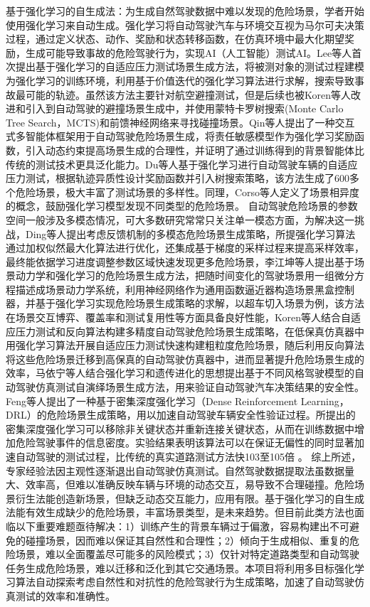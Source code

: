 基于强化学习的自生成法：为生成自然驾驶数据中难以发现的危险场景，学者开始使用强化学习来自动生成。强化学习将自动驾驶汽车与环境交互视为马尔可夫决策过程，通过定义状态、动作、奖励和状态转移函数，在仿真环境中最大化期望奖励，生成可能导致事故的危险驾驶行为，实现AI（人工智能）测试AI。Lee等人首次提出基于强化学习的自适应压力测试场景生成方法，将被测对象的测试过程建模为强化学习的训练环境，利用基于价值迭代的强化学习算法进行求解，搜索导致事故最可能的轨迹。虽然该方法主要针对航空避撞测试，但是后续也被Koren等人改进和引入到自动驾驶的避撞场景生成中，并使用蒙特卡罗树搜索(Monte Carlo Tree Search，MCTS)和前馈神经网络来寻找碰撞场景。Qin等人提出了一种交互式多智能体框架用于自动驾驶危险场景生成，将责任敏感模型作为强化学习奖励函数，引入动态约束提高场景生成的合理性，并证明了通过训练得到的背景智能体比传统的测试技术更具泛化能力。Du等人基于强化学习进行自动驾驶车辆的自适应压力测试，根据轨迹异质性设计奖励函数并引入树搜索策略，该方法生成了600多个危险场景，极大丰富了测试场景的多样性。同理，Corso等人定义了场景相异度的概念，鼓励强化学习模型发现不同类型的危险场景。
自动驾驶危险场景的参数空间一般涉及多模态情况，可大多数研究常常只关注单一模态方面，为解决这一挑战，Ding等人提出考虑反馈机制的多模态危险场景生成策略，所提强化学习算法通过加权似然最大化算法进行优化，还集成基于梯度的采样过程来提高采样效率，最终能依据学习进度调整参数区域快速发现更多危险场景，李江坤等人提出基于场景动力学和强化学习的危险场景生成方法，把随时间变化的驾驶场景用一组微分方程描述成场景动力学系统，利用神经网络作为通用函数逼近器构造场景黑盒控制器，并基于强化学习实现危险场景生成策略的求解，以超车切入场景为例，该方法在场景交互博弈、覆盖率和测试复用性等方面具备良好性能，Koren等人结合自适应压力测试和反向算法构建多精度自动驾驶危险场景生成策略，在低保真仿真器中用强化学习算法开展自适应压力测试快速构建粗粒度危险场景，随后利用反向算法将这些危险场景迁移到高保真的自动驾驶仿真器中，进而显著提升危险场景生成的效率，马依宁等人结合强化学习和遗传进化的思想提出基于不同风格驾驶模型的自动驾驶仿真测试自演绎场景生成方法，用来验证自动驾驶汽车决策结果的安全性。Feng等人提出了一种基于密集深度强化学习（Dense Reinforcement Learning，DRL）的危险场景生成策略，用以加速自动驾驶车辆安全性验证过程。所提出的密集深度强化学习可以移除非关键状态并重新连接关键状态，从而在训练数据中增加危险驾驶事件的信息密度。实验结果表明该算法可以在保证无偏性的同时显著加速自动驾驶的测试过程，比传统的真实道路测试方法快103至105倍 \cite{cheng2011analysis}。
综上所述，专家经验法因主观性逐渐退出自动驾驶仿真测试。自然驾驶数据提取法虽数据量大、效率高，但难以准确反映车辆与环境的动态交互，易导致不合理碰撞。危险场景衍生法能创造新场景，但缺乏动态交互能力，应用有限。基于强化学习的自生成法能有效生成缺少的危险场景，丰富场景类型，是未来趋势。但目前此类方法也面临以下重要难题亟待解决：1）训练产生的背景车辆过于偏激，容易构建出不可避免的碰撞场景，因而难以保证其自然性和合理性；2）倾向于生成相似、重复的危险场景，难以全面覆盖尽可能多的风险模式；3）仅针对特定道路类型和自动驾驶任务生成危险场景，难以迁移和泛化到其它交通场景。本项目将利用多目标强化学习算法自动探索考虑自然性和对抗性的危险驾驶行为生成策略，加速了自动驾驶仿真测试的效率和准确性。

